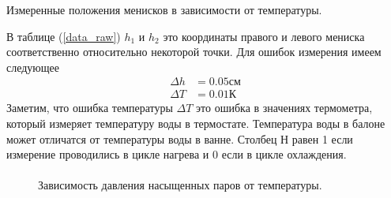 \documentclass[a4paper, 12pt]{article}
\begin{document}
\begin{table}[h!]
\begin{center}
        \caption{Измеренные положения менисков в зависимости от температуры.}
        \label{data_raw}
        \end{center}
    \end{table}

    В таблице (\ref{data_raw}) $h_1$ и $h_2$ это координаты правого и левого мениска соответственно относительно некоторой точки. Для ошибок измерения имеем следующее
    \begin{align*}
        \Delta h &= 0.05см\\
        \Delta T &= 0.01К
    \end{align*}
    Заметим, что ошибка температуры $\Delta T$ это ошибка в значениях термометра, который измеряет температуру воды в термостате. Температура воды в балоне может отличатся от температуры воды в ванне. Столбец Н равен 1 если измерение проводились в цикле нагрева и 0 если в цикле охлаждения.
    \paragraph{}



    \begin{figure}[h]
        \caption{Зависимость давления насыщенных паров от температуры.}
        \label{P(T)}
    \end{figure}
\end{document}
